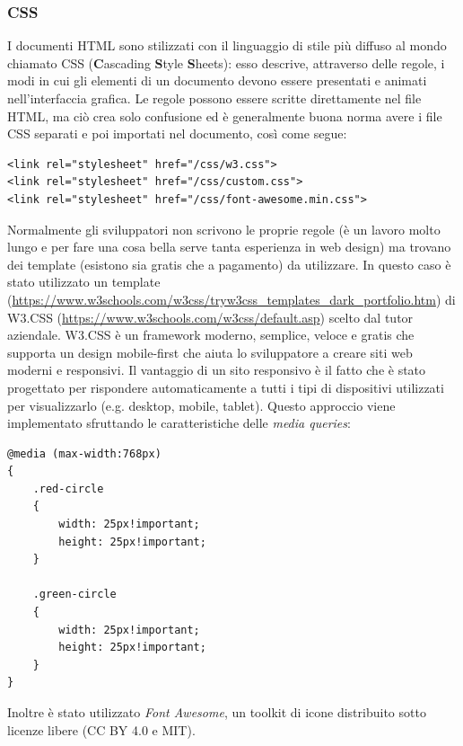 \documentclass[12pt]{report}
\begin{document}
\subsubsection*{CSS}
%
I documenti HTML sono stilizzati con il linguaggio di stile più diffuso al mondo chiamato CSS (\textbf{C}ascading \textbf{S}tyle \textbf{S}heets): esso descrive, attraverso delle regole, i modi in cui gli elementi di un documento devono essere presentati e animati nell'interfaccia grafica. Le regole possono essere scritte direttamente nel file HTML, ma ciò crea solo confusione ed è generalmente buona norma avere i file CSS separati e poi importati nel documento, così come segue:
\begin{lstlisting}
<link rel="stylesheet" href="/css/w3.css">
<link rel="stylesheet" href="/css/custom.css">
<link rel="stylesheet" href="/css/font-awesome.min.css">
\end{lstlisting}
Normalmente gli sviluppatori non scrivono le proprie regole (è un lavoro molto lungo e per fare una cosa bella serve tanta esperienza in web design) ma trovano dei template (esistono sia gratis che a pagamento) da utilizzare. In questo caso è stato utilizzato un template (\url{https://www.w3schools.com/w3css/tryw3css_templates_dark_portfolio.htm}) di W3.CSS (\url{https://www.w3schools.com/w3css/default.asp}) scelto dal tutor aziendale. W3.CSS è un framework moderno, semplice, veloce e gratis che supporta un design mobile-first che aiuta lo sviluppatore a creare siti web moderni e responsivi. Il vantaggio di un sito responsivo è il fatto che è stato progettato per rispondere automaticamente a tutti i tipi di dispositivi utilizzati per visualizzarlo (e.g. desktop, mobile, tablet). Questo approccio viene implementato sfruttando le caratteristiche delle \emph{media queries}:
\begin{lstlisting}
@media (max-width:768px)
{
	.red-circle
	{
		width: 25px!important;
		height: 25px!important;
	}
	
	.green-circle
	{
		width: 25px!important;
		height: 25px!important;
	}
}
\end{lstlisting}
Inoltre è stato utilizzato \emph{Font Awesome}, un toolkit di icone distribuito sotto licenze libere (CC BY 4.0 e MIT).
%
\end{document}
